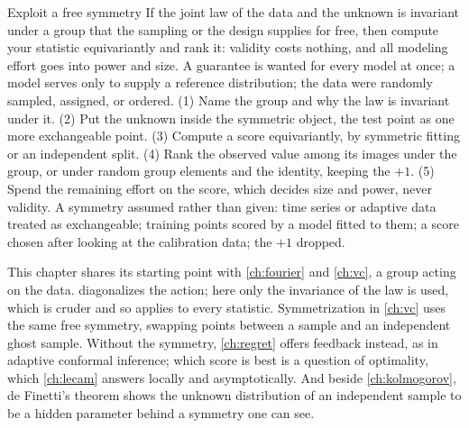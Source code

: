 \begin{refsection}
\begin{move}{Exploit a free symmetry}
 If the joint law of the data and the unknown is invariant under a group that the sampling or the design supplies for free, then compute your statistic equivariantly and rank it: validity costs nothing, and all modeling effort goes into power and size.
 A guarantee is wanted for every model at once; a model serves only to supply a reference distribution; the data were randomly sampled, assigned, or ordered.
 (1) Name the group and why the law is invariant under it. (2) Put the unknown inside the symmetric object, the test point as one more exchangeable point. (3) Compute a score equivariantly, by symmetric fitting or an independent split. (4) Rank the observed value among its images under the group, or under random group elements and the identity, keeping the $+1$. (5) Spend the remaining effort on the score, which decides size and power, never validity.
 A symmetry assumed rather than given: time series or adaptive data treated as exchangeable; training points scored by a model fitted to them; a score chosen after looking at the calibration data; the $+1$ dropped.
\end{move}


This chapter shares its starting point with \cref{ch:fourier} and \cref{ch:vc}, a group acting on the data.  diagonalizes the action; here only the invariance of the law is used, which is cruder and so applies to every statistic. Symmetrization in \cref{ch:vc} uses the same free symmetry, swapping points between a sample and an independent ghost sample. Without the symmetry, \cref{ch:regret} offers feedback instead, as in adaptive conformal inference; which score is best is a question of optimality, which \cref{ch:lecam} answers locally and asymptotically. And beside \cref{ch:kolmogorov}, de Finetti's theorem shows the unknown distribution of an independent sample to be a hidden parameter behind a symmetry one can see.


\end{refsection}
